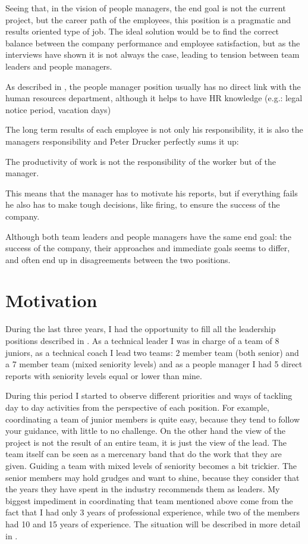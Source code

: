 Seeing that, in the vision of people managers, the end goal is not the current project, but the career path of the employees, this position is a pragmatic and results oriented type of job. The ideal solution would be to find the correct balance between the company performance and employee satisfaction, but as the interviews have shown it is not always the case, leading to tension between team leaders and people managers.

As described in \cite{abur-pm}, the people manager position usually has no direct link with the human resources department, although it helps to have HR knowledge (e.g.: legal notice period, vacation days)

The long term results of each employee is not only his responsibility, it is also the managers responsibility and Peter Drucker perfectly sums it up:
\begin{displayquote}
The productivity of work is not the responsibility of the worker but of the manager.
\end{displayquote}
This means that the manager has to motivate his reports, but if everything fails he also has to make tough decisions, like firing, to ensure the success of the company.

Although both team leaders and people managers have the same end goal: the success of the company, their approaches and immediate goals seems to differ, and often end up in disagreements between the two positions.
 
\section{Motivation}
\label{sec:motivation}
During the last three years, I had the opportunity to fill all the leadership positions described in . As a technical leader I was in charge of a team of 8 juniors, as a technical coach I lead two teams: 2 member team (both senior) and a 7 member team (mixed seniority levels) and as a people manager I had 5 direct reports with seniority levels equal or lower than mine. 

During this period I started to observe different priorities and ways of tackling day to day activities from the perspective of each position. For example, coordinating a team of junior members is quite easy, because they tend to follow your guidance, with little to no challenge. On the other hand the view of the project is not the result of an entire team, it is just the view of the lead. The team itself can be seen as a mercenary band that do the work that they are given. Guiding a team with mixed levels of seniority becomes a bit trickier. The senior members may hold grudges and want to shine, because they consider that the years they have spent in the industry recommends them as leaders. My biggest impediment in coordinating that team mentioned above come from the fact that I had only 3 years of professional experience, while two of the members had 10 and 15 years of experience. The situation will be described in more detail in .

